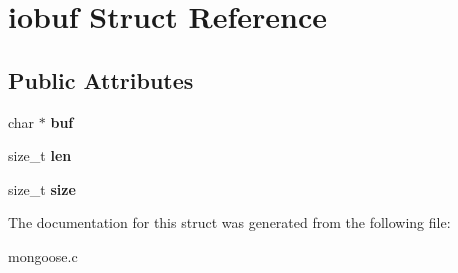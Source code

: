 \hypertarget{structiobuf}{\section{iobuf Struct Reference}
\label{structiobuf}
}
\subsection*{Public Attributes}
\begin{DoxyCompactItemize}
\item 
\hypertarget{structiobuf_a2ffa253d36125704954f291d3e76dfba}{char $\ast$ {\bfseries buf}}\label{structiobuf_a2ffa253d36125704954f291d3e76dfba}

\item 
\hypertarget{structiobuf_a2f68dd7bfaffe90bce672a38bc863205}{size\-\_\-t {\bfseries len}}\label{structiobuf_a2f68dd7bfaffe90bce672a38bc863205}

\item 
\hypertarget{structiobuf_a2dbeff3cc1ac19c879f92458eff91510}{size\-\_\-t {\bfseries size}}\label{structiobuf_a2dbeff3cc1ac19c879f92458eff91510}

\end{DoxyCompactItemize}


The documentation for this struct was generated from the following file\-:\begin{DoxyCompactItemize}
\item 
mongoose.\-c\end{DoxyCompactItemize}
